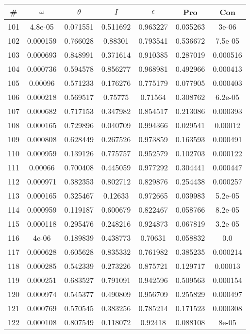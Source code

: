 \newpage
\begin{table}
\begin{tabular}{c|c|c|c|c|c|c}
\# & $\omega$ & $\theta$ & $I$ & $\epsilon$ & Pro & Con\\
\hline
101 & 4.8e-05 & 0.071551 & 0.511692 & 0.963227 & 0.035263 & 3e-06\\
102 & 0.000159 & 0.766028 & 0.88301 & 0.793541 & 0.536672 & 7.5e-05\\
103 & 0.000693 & 0.848991 & 0.371614 & 0.910385 & 0.287019 & 0.000516\\
104 & 0.000736 & 0.594578 & 0.856277 & 0.968981 & 0.492966 & 0.000413\\
105 & 0.00096 & 0.571233 & 0.176276 & 0.775179 & 0.077905 & 0.000403\\
106 & 0.000218 & 0.569517 & 0.75775 & 0.71564 & 0.308762 & 6.2e-05\\
107 & 0.000682 & 0.717153 & 0.347982 & 0.854517 & 0.213086 & 0.000393\\
108 & 0.000165 & 0.729896 & 0.040709 & 0.994366 & 0.029541 & 0.00012\\
109 & 0.000808 & 0.628449 & 0.267526 & 0.973859 & 0.163593 & 0.000491\\
110 & 0.000959 & 0.139126 & 0.775757 & 0.952579 & 0.102703 & 0.000122\\
111 & 0.00066 & 0.700408 & 0.445059 & 0.977292 & 0.304441 & 0.000447\\
112 & 0.000971 & 0.382353 & 0.802712 & 0.829876 & 0.254438 & 0.000257\\
113 & 0.000165 & 0.325467 & 0.12633 & 0.972665 & 0.039983 & 5.2e-05\\
114 & 0.000959 & 0.119187 & 0.600679 & 0.822467 & 0.058766 & 8.2e-05\\
115 & 0.000118 & 0.295476 & 0.248216 & 0.924873 & 0.067819 & 3.2e-05\\
116 & 4e-06 & 0.189839 & 0.438773 & 0.70631 & 0.058832 & 0.0\\
117 & 0.000628 & 0.605628 & 0.835332 & 0.761982 & 0.385235 & 0.000214\\
118 & 0.000285 & 0.542339 & 0.273226 & 0.875721 & 0.129717 & 0.00013\\
119 & 0.000251 & 0.683527 & 0.791091 & 0.942596 & 0.509563 & 0.000154\\
120 & 0.000974 & 0.545377 & 0.490809 & 0.956709 & 0.255829 & 0.000497\\
121 & 0.000769 & 0.570545 & 0.383256 & 0.785214 & 0.171523 & 0.000308\\
122 & 0.000108 & 0.807549 & 0.118072 & 0.92418 & 0.088108 & 8e-05\\

\end{tabular}
\end{table}
